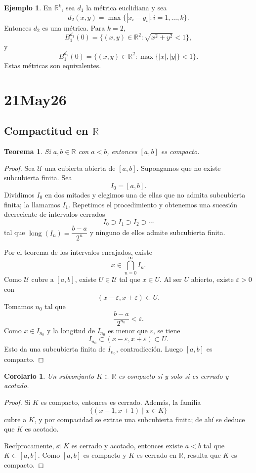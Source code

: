 \documentclass[12pt]{article}
\theoremstyle{definition}
\newtheorem{example}[definition]{Ejemplo}
\theoremstyle{plain}
\newtheorem{theorem}[definition]{Teorema}
\newtheorem{corollary}[definition]{Corolario}
\theoremstyle{remark}
\begin{document}
\begin{example}
En $\mathbb R^k$, sea $d_1$ la métrica euclidiana y sea
\[
d_2(x,y)=\max\{|x_i-y_i|:i=1,\dots,k\}.
\]
Entonces $d_2$ es una métrica.
Para $k=2$,
\[
B^{d_1}_1(0)=\{(x,y)\in\mathbb R^2:\sqrt{x^2+y^2}<1\},
\]
y
\[
B^{d_2}_1(0)=\{(x,y)\in\mathbb R^2:\max\{|x|,|y|\}<1\}.
\]
Estas métricas son equivalentes.
\end{example}

\section*{21May26}

\subsection*{Compactitud en $\mathbb R$}

\begin{theorem}
Si $a,b\in\mathbb R$ con $a<b$, entonces $[a,b]$ es compacto.
\end{theorem}

\begin{proof}
Sea $\mathcal U$ una cubierta abierta de $[a,b]$.
Supongamos que no existe subcubierta finita.
Sea
\[
I_0=[a,b].
\]
Dividimos $I_0$ en dos mitades y elegimos una de ellas que no admita subcubierta finita; la llamamos $I_1$.
Repetimos el procedimiento y obtenemos una sucesión decreciente de intervalos cerrados
\[
I_0\supset I_1\supset I_2\supset\cdots
\]
tal que $\operatorname{long}(I_n)=\dfrac{b-a}{2^n}$ y ninguno de ellos admite subcubierta finita.

Por el teorema de los intervalos encajados, existe
\[
x\in \bigcap_{n=0}^\infty I_n.
\]
Como $\mathcal U$ cubre a $[a,b]$, existe $U\in\mathcal U$ tal que $x\in U$.
Al ser $U$ abierto, existe $\varepsilon>0$ con
\[
(x-\varepsilon,x+\varepsilon)\subset U.
\]
Tomamos $n_0$ tal que
\[
\frac{b-a}{2^{n_0}}<\varepsilon.
\]
Como $x\in I_{n_0}$ y la longitud de $I_{n_0}$ es menor que $\varepsilon$, se tiene
\[
I_{n_0}\subset (x-\varepsilon,x+\varepsilon)\subset U.
\]
Esto da una subcubierta finita de $I_{n_0}$, contradicción.
Luego $[a,b]$ es compacto.
\end{proof}

\begin{corollary}
Un subconjunto $K\subset\mathbb R$ es compacto si y solo si es cerrado y acotado.
\end{corollary}

\begin{proof}
Si $K$ es compacto, entonces es cerrado. Además, la familia
\[
\{(x-1,x+1)\mid x\in K\}
\]
cubre a $K$, y por compacidad se extrae una subcubierta finita; de ahí se deduce que $K$ es acotado.

Recíprocamente, si $K$ es cerrado y acotado, entonces existe $a<b$ tal que $K\subset[a,b]$.
Como $[a,b]$ es compacto y $K$ es cerrado en $\mathbb R$, resulta que $K$ es compacto.
\end{proof}
\end{document}

